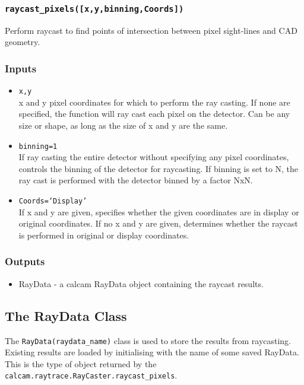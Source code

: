 \documentclass[12pt]{article}
\newcommand{\code}[1]{\texttt{#1}}
\begin{document}
\subsubsection*{\code{raycast\_pixels([x,y,binning,Coords])}}
\begin{adjustwidth}{0.5cm}{0cm}
Perform raycast to find points of intersection between pixel sight-lines and CAD geometry.
\subsubsection*{Inputs}
\begin{itemize}
\item{\code{x,y}\\x and y pixel coordinates for which to perform the ray casting. If none are specified, the function will ray cast each pixel on the detector. Can be any size or shape, as long as the size of x and y are the same.}
\item{\code{binning=1}\\If ray casting the entire detector without specifying any pixel coordinates, controls the binning of the detector for raycasting. If binning is set to N, the ray cast is performed with the detector binned by a factor NxN.}
\item{\code{Coords=`Display'}\\ If x and y are given, specifies whether the given coordinates are in display or original coordinates. If no x and y are given, determines whether the raycast is performed in original or display coordinates.}
\end{itemize}

\subsubsection*{Outputs}
\begin{itemize}
\item{RayData - a calcam RayData object containing the raycast results.}
\end{itemize}
\end{adjustwidth}

\subsection{The RayData Class}
The \code{RayData(raydata\_name)} class is used to store the results from raycasting. Existing results are loaded by initialising with the name of some saved RayData. This is the type of object returned by the \code{calcam.raytrace.RayCaster.raycast\_pixels}.
\end{document}
